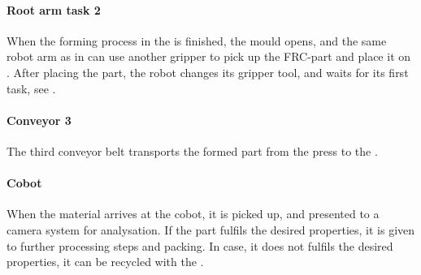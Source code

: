 \paragraph{Root arm task 2} \label{sec:RobotArm2}
When the forming process in the  is finished, the mould opens, and the same robot arm as in  can use another gripper to pick up  the \ac{FRC}-part and place it on .
After placing the part, the robot changes its gripper tool, and waits for its first task, see .

\paragraph{Conveyor 3}\label{sec:conveyor3}
The third conveyor belt transports the formed part from the press to the .

\paragraph{Cobot} \label{sec:Cobot}
When the material arrives at the cobot, it is picked up, and presented to a camera system for analysation. If the part fulfils the desired properties, it is given to further processing steps and packing.
In case, it does not fulfils the desired properties, it can be recycled with the .